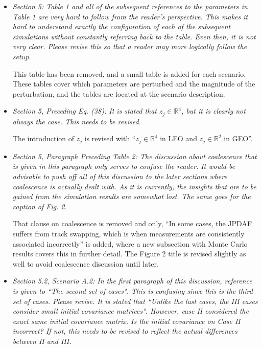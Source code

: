 \documentclass[11pt]{article}
\renewcommand{\Re}{\ensuremath{\mathbb{R}}}
\begin{document}
\begin{itemize}
\item {\itshape Section 5:
Table 1 and all of the subsequent references to the parameters in Table 1 are very hard to follow from the reader's perspective.  This makes it hard to understand exactly the configuration of each of the subsequent simulations without constantly referring back to the table.  Even then, it is not very clear.  Please revise this so that a reader may more logically follow the setup.}

This table has been removed, and a small table is added for each scenario. These tables cover which parameters are perturbed and the magnitude of the perturbation, and the tables are located at the scenario description.

\item {\itshape Section 5, Preceding Eq. (38):
It is stated that $z_j \in \Re^4$, but it is clearly not always the case.  This needs to be revised.}

The introduction of $z_j$ is revised with ``$z_j\in\Re^4$ in LEO and $z_j\in\Re^2$ in GEO''.

\item {\itshape Section 5, Paragraph Preceding Table 2:
The discussion about coalescence that is given in this paragraph only serves to confuse the reader.  It would be advisable to push off all of this discussion to the later sections where coalescence is actually dealt with.  As it is currently, the insights that are to be gained from the simulation results are somewhat lost.  The same goes for the caption of Fig. 2.}

That clause on coalescence is removed and only, ``In some cases, the JPDAF suffers from track swapping, which is when measurements are consistently associated incorrectly'' is added, where a new subsection with Monte Carlo results covers this in further detail. The Figure 2 title is revised slightly as well to avoid coalescence discussion until later.

\item {\itshape Section 5.2, Scenario A.2:
In the first paragraph of this discussion, reference is given to ``The second set of cases".  This is confusing since this is the third set of cases.  Please revise. It is stated that ``Unlike the last cases, the III cases consider small initial covariance matrices".  However, case II considered the exact same initial covariance matrix.  Is the initial covariance on Case II incorrect?  If not, this needs to be revised to reflect the actual differences between II and III.}


\end{itemize}
\end{document}
